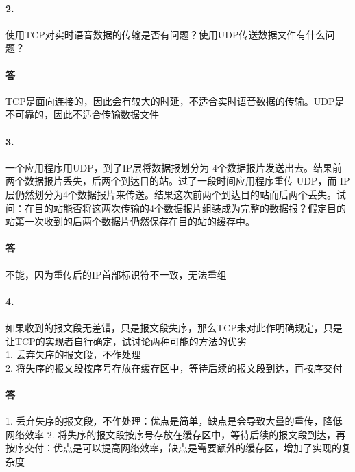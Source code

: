 \documentclass[UTF8]{ctexart} %
\begin{document}
\paragraph{2.} 使用TCP对实时语音数据的传输是否有问题？使用UDP传送数据文件有什么问题？

\paragraph{答} TCP是面向连接的，因此会有较大的时延，不适合实时语音数据的传输。UDP是不可靠的，因此不适合传输数据文件

\paragraph{3.} 一个应用程序用UDP，到了IP层将数据报划分为 4个数据报片发送出去。结果前两个数据报片丢失，后两个到达目的站。过了一段时间应用程序重传 UDP，而 IP 层仍然划分为4个数据报片来传送。结果这次前两个到达目的站而后两个丢失。试问：在目的站能否将这两次传输的4个数据报片组装成为完整的数据报？假定目的站第一次收到的后两个数据片仍然保存在目的站的缓存中。

\paragraph{答} 不能，因为重传后的IP首部标识符不一致，无法重组

\paragraph{4.} 如果收到的报文段无差错，只是报文段失序，那么TCP未对此作明确规定，只是让TCP的实现者自行确定，试讨论两种可能的方法的优劣\\
1. 丢弃失序的报文段，不作处理\\
2. 将失序的报文段按序号存放在缓存区中，等待后续的报文段到达，再按序交付

\paragraph{答} 1. 丢弃失序的报文段，不作处理：优点是简单，缺点是会导致大量的重传，降低网络效率
2. 将失序的报文段按序号存放在缓存区中，等待后续的报文段到达，再按序交付：优点是可以提高网络效率，缺点是需要额外的缓存区，增加了实现的复杂度
\end{document}
